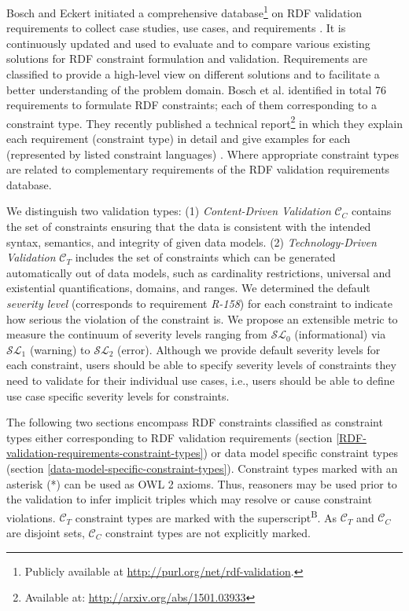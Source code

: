 \documentclass{llncs}
\begin{document}
Bosch and Eckert initiated a comprehensive database\footnote{Publicly available at \url{http://purl.org/net/rdf-validation}.} on RDF validation requirements to collect case studies, use cases, and requirements \cite{BoschEckert2014}. 
It is continuously updated and used to evaluate and to compare various existing solutions for RDF constraint formulation and validation. 
Requirements are classified to provide a high-level view on different solutions and to facilitate a better understanding of the problem domain.
Bosch et al. identified in total 76 requirements to formulate RDF constraints; each of them corresponding to a constraint type. 
They recently published a technical report\footnote{Available at: \url{http://arxiv.org/abs/1501.03933}} in which they explain each requirement (constraint type) in detail and give examples for each (represented by listed constraint languages) \cite{BoschNolleAcarEckert2015}.
Where appropriate constraint types are related to complementary requirements of the RDF validation requirements database.

We distinguish two validation types:
(1) \emph{Content-Driven Validation} $\mathcal{C}_{C}$ contains the set of constraints ensuring that the data is consistent with the intended syntax, semantics, and integrity of given data models.
(2) \emph{Technology-Driven Validation} $\mathcal{C}_{T}$ includes the set of constraints which can be generated automatically out of data models, such as cardinality restrictions, universal and existential quantifications, domains, and ranges.
We determined the default \emph{severity level} (corresponds to requirement \emph{R-158}) for each constraint to indicate how serious the violation of the constraint is.
We propose an extensible metric to measure the continuum of severity levels ranging from $\mathcal{SL}_{0}$ (informational) via $\mathcal{SL}_{1}$ (warning) to $\mathcal{SL}_{2}$ (error). 
Although we provide default severity levels for each constraint, users should be able to specify severity levels of constraints they need to validate for their individual use cases, i.e., users should be able to define use case specific severity levels for constraints.

The following two sections encompass RDF constraints classified as constraint types either corresponding to RDF validation requirements (section \ref{RDF-validation-requirements-constraint-types}) or data model specific constraint types (section \ref{data-model-specific-constraint-types}).
Constraint types marked with an asterisk (*) can be used as OWL 2 axioms. Thus, reasoners may be used prior to the validation to infer implicit triples which may resolve or cause constraint violations.
$\mathcal{C}_{T}$ constraint types are marked with the superscript\textsuperscript{B}.
As $\mathcal{C}_{T}$ and $\mathcal{C}_{C}$ are disjoint sets, $\mathcal{C}_{C}$ constraint types are not explicitly marked.
\end{document}
